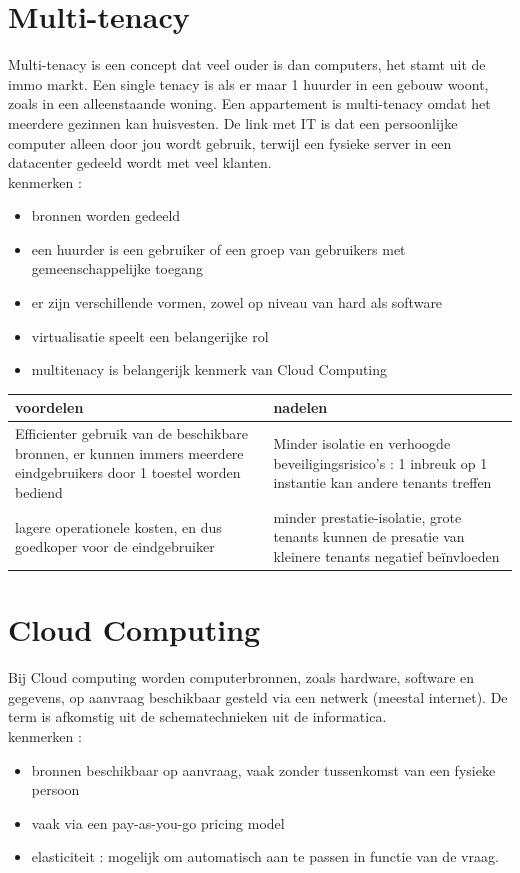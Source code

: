 \documentclass{report}
\begin{document}
   		\section{Multi-tenacy}
   			Multi-tenacy is een concept dat veel ouder is dan computers, het stamt uit de immo markt. Een single tenacy is als er maar 1 huurder in een gebouw woont, zoals in een alleenstaande woning. Een appartement is multi-tenacy omdat het meerdere gezinnen kan huisvesten. De link met IT is dat een persoonlijke computer alleen door jou wordt gebruik, terwijl een fysieke server in een datacenter gedeeld wordt met veel klanten. 
   			\\ kenmerken : 
   			\begin{itemize}
   				\item bronnen worden gedeeld
   				\item een huurder is een gebruiker of een groep van gebruikers met gemeenschappelijke toegang 
   				\item er zijn verschillende vormen, zowel op niveau van hard als software
   				\item virtualisatie speelt een belangerijke rol
   				\item multitenacy is belangerijk kenmerk van Cloud Computing
   			\end{itemize}
	   		\begin{center}
	   			\begin{tabular}{| m{20em} | m{20em} | }
	   				\hline
	   				\textbf{voordelen} & \textbf{nadelen} \\
	   				\hline
	   				
					Efficienter gebruik van de beschikbare bronnen, er kunnen immers meerdere eindgebruikers door 1 toestel worden bediend
	   				 & Minder isolatie en verhoogde beveiligingsrisico's : 1 inbreuk op 1 instantie kan andere tenants treffen \\ 
	   				\hline
	   				lagere operationele kosten, en dus goedkoper voor de eindgebruiker & minder prestatie-isolatie, grote tenants kunnen de presatie van kleinere tenants negatief beïnvloeden \\  
	   				\hline
	   			\end{tabular}
	   		\end{center}
   		\section{Cloud Computing}
   			Bij Cloud computing worden computerbronnen, zoals hardware, software en gegevens, op aanvraag beschikbaar gesteld via een netwerk (meestal internet). De term is afkomstig uit de schematechnieken uit de informatica.
   			\\
   			kenmerken : 
   			\begin{itemize}
   				\item bronnen beschikbaar op aanvraag, vaak zonder tussenkomst van een fysieke persoon
   				\item vaak via een pay-as-you-go pricing model 
   				\item elasticiteit : mogelijk om automatisch aan te passen in functie van de vraag. 
   			\end{itemize}
\end{document}

